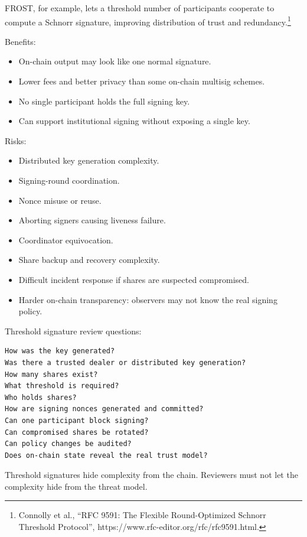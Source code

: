 FROST, for example, lets a threshold number of participants cooperate to
compute a Schnorr signature, improving distribution of trust and
redundancy.\footnote{Connolly et al., ``RFC 9591: The Flexible
  Round-Optimized Schnorr Threshold Protocol'',
  https://www.rfc-editor.org/rfc/rfc9591.html.}

Benefits:

\begin{itemize}
\tightlist
\item
  On-chain output may look like one normal signature.
\item
  Lower fees and better privacy than some on-chain multisig schemes.
\item
  No single participant holds the full signing key.
\item
  Can support institutional signing without exposing a single key.
\end{itemize}

Risks:

\begin{itemize}
\tightlist
\item
  Distributed key generation complexity.
\item
  Signing-round coordination.
\item
  Nonce misuse or reuse.
\item
  Aborting signers causing liveness failure.
\item
  Coordinator equivocation.
\item
  Share backup and recovery complexity.
\item
  Difficult incident response if shares are suspected compromised.
\item
  Harder on-chain transparency: observers may not know the real signing
  policy.
\end{itemize}

Threshold signature review questions:

\begin{lstlisting}
How was the key generated?
Was there a trusted dealer or distributed key generation?
How many shares exist?
What threshold is required?
Who holds shares?
How are signing nonces generated and committed?
Can one participant block signing?
Can compromised shares be rotated?
Can policy changes be audited?
Does on-chain state reveal the real trust model?
\end{lstlisting}

Threshold signatures hide complexity from the chain. Reviewers must not
let the complexity hide from the threat model.

